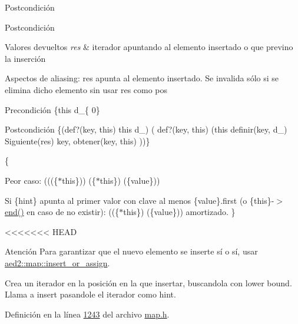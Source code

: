 \begin{DoxyPostcond}{\-Postcondición}
\begin{DoxyPostcond}{\-Postcondición}
\begin{DoxyRetVals}{Valores devueltos}
{\em res} & iterador apuntando al elemento insertado o que previno la inserción\\
\hline
\end{DoxyRetVals}
\begin{DoxyParagraph}{Aspectos de aliasing\+:}
res apunta al elemento insertado. Se invalida sólo si se elimina dicho elemento sin usar res como pos
\end{DoxyParagraph}
\begin{DoxyPrecond}{Precondición}
\{this  d\+\_\+\{ 0\} 
\end{DoxyPrecond}
\begin{DoxyPostcond}{Postcondición}
\{(def?(key, this)  this  d\+\_)  ( def?(key, this)  (this  definir(key, d\+\_)  Siguiente(res)   key, obtener(key, this)  ))\}
\end{DoxyPostcond}
\{
\begin{DoxyItemize}
\item Peor caso\+: (((\{$\ast$this\}))  (\{$\ast$this\})  (\{value\}))
\item Si \{hint\} apunta al primer valor con clave al menos \{value\}.first (o \{this\}-\/$>$\hyperlink{classaed2_1_1map_a76023e6a56cb625513e1b5ea028bf983_a76023e6a56cb625513e1b5ea028bf983}{end()} en caso de no existir)\+: ((\{$\ast$this\})  (\{value\})) amortizado. \}
\end{DoxyItemize}

<<<<<<< HEAD
\begin{DoxyAttention}{\-Atención}
\-Para garantizar que el nuevo elemento se inserte sí o sí, usar \hyperlink{classaed2_1_1map_a2ef6723c183916276b0afc4a4c721475_a2ef6723c183916276b0afc4a4c721475}{aed2\-::map\-::insert\-\_\-or\-\_\-assign}.
\end{DoxyAttention}
\-Crea un iterador en la posición en la que insertar, buscandola con lower bound. \-Llama a insert pasandole el iterador como hint. 

\-Definición en la línea \hyperlink{map_8h_source_l01243}{1243} del archivo \hyperlink{map_8h_source}{map.\-h}.

\hypertarget{classaed2_1_1map_a6941cde9a79c27f054b5c97a587a1854_a6941cde9a79c27f054b5c97a587a1854}{
}
\end{DoxyPostcond}
\end{DoxyPostcond}
